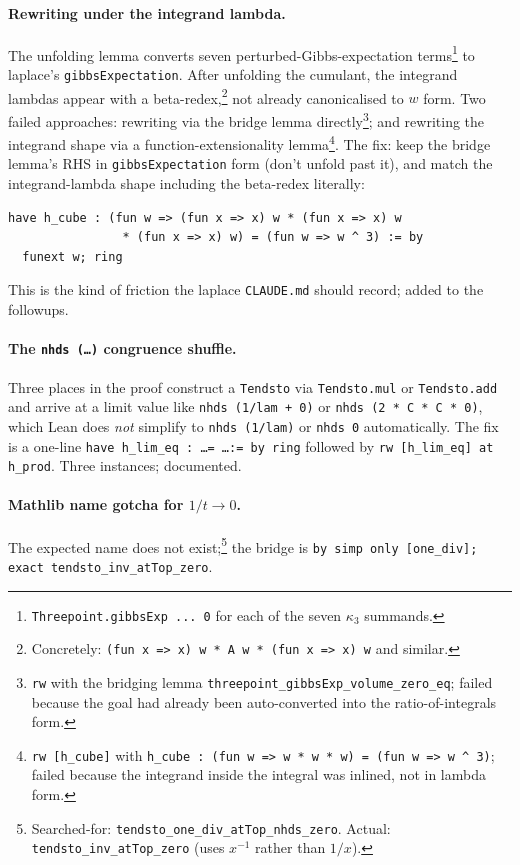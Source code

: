 \documentclass[11pt]{article}
\begin{document}
\paragraph{Rewriting under the integrand lambda.} The unfolding lemma
converts seven perturbed-Gibbs-expectation
terms\footnote{\texttt{Threepoint.gibbsExp~...~0} for each of the seven
$\kappa_3$ summands.} to laplace's \texttt{gibbsExpectation}. After
unfolding the cumulant, the integrand lambdas appear with a
beta-redex,\footnote{Concretely:
\texttt{(fun x => x) w * A w * (fun x => x) w} and similar.} not
already canonicalised to $w$ form. Two failed approaches: rewriting
via the bridge lemma directly\footnote{\texttt{rw} with the bridging
lemma \texttt{threepoint\_gibbsExp\_volume\_zero\_eq}; failed because
the goal had already been auto-converted into the ratio-of-integrals
form.}; and rewriting the integrand shape via a function-extensionality
lemma\footnote{\texttt{rw [h\_cube]} with
\texttt{h\_cube : (fun w => w * w * w) = (fun w => w \^{} 3)}; failed
because the integrand inside the integral was inlined, not in lambda
form.}. The fix: keep the bridge lemma's RHS in
\texttt{gibbsExpectation} form (don't unfold past it), and match the
integrand-lambda shape including the beta-redex literally:

\begin{verbatim}
have h_cube : (fun w => (fun x => x) w * (fun x => x) w
                * (fun x => x) w) = (fun w => w ^ 3) := by
  funext w; ring
\end{verbatim}

This is the kind of friction the laplace \texttt{CLAUDE.md} should
record; added to the followups.

\paragraph{The \texttt{nhds (\ldots)} congruence shuffle.} Three places
in the proof construct a \texttt{Tendsto} via \texttt{Tendsto.mul} or
\texttt{Tendsto.add} and arrive at a limit value like
\texttt{nhds (1/lam + 0)} or \texttt{nhds (2 * C * C * 0)}, which
Lean does \emph{not} simplify to \texttt{nhds (1/lam)} or
\texttt{nhds 0} automatically. The fix is a one-line
\texttt{have h\_lim\_eq : \ldots = \ldots := by ring} followed by
\texttt{rw [h\_lim\_eq] at h\_prod}. Three instances; documented.

\paragraph{Mathlib name gotcha for $1/t \to 0$.} The expected name does
not exist;\footnote{Searched-for: \texttt{tendsto\_one\_div\_atTop\_nhds\_zero}.
Actual: \texttt{tendsto\_inv\_atTop\_zero} (uses $x^{-1}$ rather than
$1/x$).} the bridge is
\verb|by simp only [one_div]; exact tendsto_inv_atTop_zero|.
\end{document}
